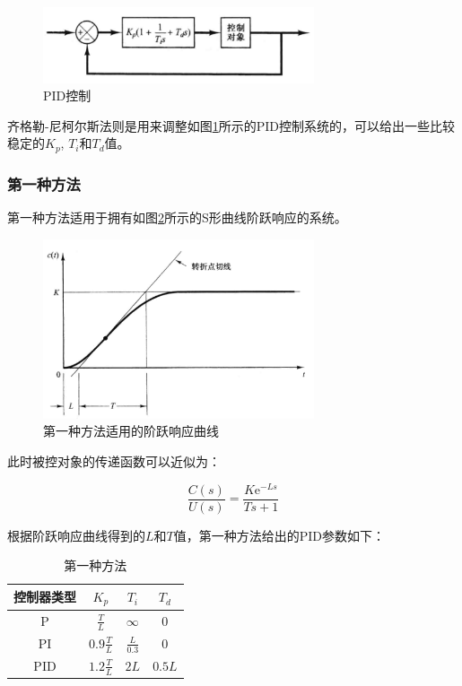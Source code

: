 \begin{figure}[!ht]
	\centering
	\includegraphics[width=8cm]{figures/35.png}
	\caption{PID控制}
	\label{35}
\end{figure}

齐格勒-尼柯尔斯法则是用来调整如图\ref{35}所示的PID控制系统的，可以给出一些比较稳定的$K_p$, $T_i$和$T_d$值。

\subsubsection{第一种方法}

第一种方法适用于拥有如图\ref{36}所示的S形曲线阶跃响应的系统。

\begin{figure}[!ht]
	\centering
	\includegraphics[width=8cm]{figures/36.png}
	\caption{第一种方法适用的阶跃响应曲线}
	\label{36}
\end{figure}

此时被控对象的传递函数可以近似为：

\begin{equation*}
	\frac{C(s)}{U(s)}=\frac{K \mathrm{e}^{-L s}}{T s+1}
\end{equation*}

根据阶跃响应曲线得到的$L$和$T$值，第一种方法给出的PID参数如下：

\begin{table}[!h]
	\centering
	\caption{第一种方法}
	\begin{tabular}{|c|c|c|c|}
		\hline
		控制器类型	&	$K_p$	&	$T_i$	&	$T_d$\\\hline
		P	&	$\frac{T}{L}$	&	$\infty$	&	$0$	\\\hline
		PI	&	$0.9\frac{T}{L}$	&	$\frac{L}{0.3}$	&	$0$	\\\hline
		PID	&	$1.2\frac{T}{L}$	&	$2L$	&	$0.5L$	\\\hline
	\end{tabular}
\end{table}

